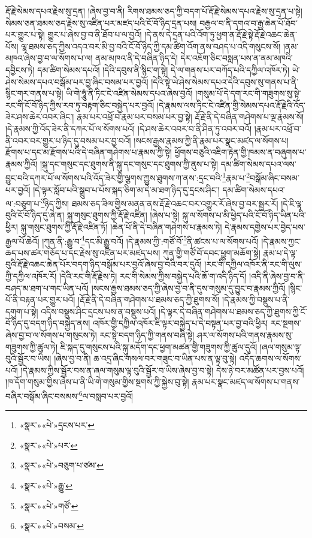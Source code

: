 རྡོ་རྗེ་སེམས་དཔའ་རྗེས་སུ་དྲན། །ཞེས་བྱ་བ་ནི། རིགས་ཐམས་ཅད་ཀྱི་བདག་པོ་རྡོ་རྗེ་སེམས་དཔའ་རྗེས་སུ་དྲན་པ་སྟེ། སེམས་ཅན་ཐམས་ཅད་རྗེས་སུ་འཛིན་པར་མཛད་པའི་ངོ་བོ་ཉིད་དྲན་པས། བརྒྱལ་བ་ནི་དགའ་བ་རྒྱ་ཆེན་པོ་ཐོབ་པར་གྱུར་པ་སྟེ། གྱུར་པ་ཞེས་བྱ་བ་ནི་ཐོབ་པ་ལ་བྱའོ། །དེ་ནས་དེ་དྲན་པའི་འོག་ཏུ་ཕྱག་ན་རྡོ་རྗེ་སྟེ་རྡོ་རྗེ་འཆང་ཆེན་པོས། ལྷ་ཐམས་ཅད་ཀྱིས་འདའ་བར་མི་བྱ་བའི་ངོ་བོ་ཉིད་ཀྱི་དམ་ཚིག་འོག་ནས་བཤད་པ་འདི་གསུངས་སོ། །ནམ་མཁའ་ཞེས་བྱ་བ་ལ་སོགས་པ་ལ། ནམ་མཁའ་ནི་དེ་བཞིན་ཉིད་དེ། དེར་འཇོག་ཅིང་བསླན་པས་ན་ནམ་མཁའི་དབྱིངས་ཏེ། དམ་ཚིག་སེམས་དཔའོ། །དེའི་དབུས་ནི་སྙིང་ག་སྟེ། དེ་ལ་གནས་པར་བཀོད་པའི་དཀྱིལ་འཁོར་ཏེ། ཡེ་ཤེས་སེམས་དཔའ་བསྒོམ་པར་བྱ་ཞིང་བསམ་པར་བྱའོ། །དེའི་སྟེ་ཡེ་ཤེས་སེམས་དཔའ་དེའི་དབུས་སུ་གནས་པ་ནི་སྙིང་གར་གནས་པ་སྟེ། ཡི་གེ་ཧཱུཾ་ནི་ཏིང་ངེ་འཛིན་སེམས་དཔའ་ཞེས་བྱའོ། །གསུམ་པོ་དེ་དག་རང་གི་གཟུགས་སུ་སྟེ་རང་གི་ངོ་བོ་ཉིད་ཀྱིས་རབ་ཏུ་བརྟག་ཅིང་བསྐྱེད་པར་བྱའོ། །དེ་རྣམས་ལས་ཏིང་ངེ་འཛིན་གྱི་སེམས་དཔའ་རྡོ་རྗེའི་འོད་ཟེར་ཤས་ཆེར་འབར་ཞིང་། རྣམ་པར་འཕྲོ་བ་རྣམ་པར་བསམ་པར་བྱ་སྟེ། རྡོ་རྗེ་ནི་དེ་བཞིན་གཤེགས་པ་ལྔ་རྣམས་སོ། །དེ་རྣམས་ཀྱི་འོད་ཟེར་ནི་དཀར་པོ་ལ་སོགས་པའོ། །དེ་ཤས་ཆེར་འབར་བ་ནི་ཤིན་ཏུ་འབར་བའོ། །རྣམ་པར་འཕྲོ་བ་ནི་འབར་བར་གྱུར་པ་ཉིད་དུ་བསམ་པར་བྱ་བའོ། །སངས་རྒྱས་རྣམས་ཀྱི་ནི་རྣམ་པར་སྣང་མཛད་ལ་སོགས་པ། རྫོགས་པ་དང་མ་རྫོགས་པའི་དེ་བཞིན་གཤེགས་པ་རྣམས་ཀྱི་སྟེ། ཕྱོགས་བཅུའི་འཇིག་རྟེན་གྱི་ཁམས་ན་བཞུགས་པ་རྣམས་ཀྱིའོ། །སྐུ་དང་གསུང་དང་ཐུགས་ནི་སྐུ་དང་གསུང་དང་ཐུགས་ཀྱི་ནུས་པ་སྟེ། དམ་ཚིག་སེམས་དཔའ་ལས་བྱུང་བའི་དཀར་པོ་ལ་སོགས་པའི་འོད་ཟེར་གྱི་ལྕགས་ཀྱུས་ཐུགས་ཀ་ནས་:དྲང་བའི་\footnote{«སྣར་»«པེ་»དྲངས་པར་}རྣམ་པ་\footnote{«སྣར་»«པེ་»པར་}བསྒོམ་ཞིང་བསམ་པར་བྱའོ། །དེ་ལྟར་སློབ་པའི་སྒྲུབ་པ་པོས་སྐད་ཅིག་མ་དེ་མ་ཐག་ཉིད་དུ་དྲངས་ཤིང་། དམ་ཚིག་སེམས་དཔའ་ལ་:བཅུག་པ་\footnote{«སྣར་»«པེ་»བཅུག་པ་ཙམ་}ཉིད་ཀྱིས། ཐམས་ཅད་ཟིལ་གྱིས་མནན་ནས་རྡོ་རྗེ་འཆང་བར་འགྱུར་རོ་ཞེས་བྱ་བར་སྦྱར་རོ། །དེ་ཇི་ལྟ་བུའི་ངོ་བོ་ཉིད་དུ་ཞེ་ན། སྐུ་གསུང་ཐུགས་ཀྱི་རྡོ་རྗེ་འཛིན། །ཞེས་པ་སྟེ། སྐུ་ལ་སོགས་པ་མི་ཕྱེད་པའི་ངོ་བོ་ཉིད་ཡིན་པའི་ཕྱིར། སྐུ་གསུང་ཐུགས་ཀྱི་རྡོ་རྗེ་འཛིན་ཏོ། །ཆེན་པོ་ནི་དེ་བཞིན་གཤེགས་པ་རྣམས་ཏེ། དེ་རྣམས་དགྱེས་པར་བྱེད་པས་རྒྱལ་པོ་ཆེའོ། །ཀུན་ནི་:རྒྱུ་བ་\footnote{«སྣར་»«པེ་»རྒྱུ་}དང་མི་རྒྱུ་བའོ། །དེ་རྣམས་ཀྱི་:གཙོ་བོ་\footnote{«སྣར་»«པེ་»གཙོ་}ནི་ཚངས་པ་ལ་སོགས་པའོ། །དེ་རྣམས་ཀྱང་ཆད་པས་ཚར་གཅོད་པ་དང་རྗེས་སུ་འཛིན་པར་མཛད་པས། ཀུན་གྱི་གཙོ་བོ་དབང་ཕྱུག་མཆོག་སྟེ། རྣམ་པ་དེ་ལྟ་བུའི་རྡོ་རྗེ་འཆང་ཆེན་པོར་བདག་ཉིད་བསྒོམ་པར་བྱའོ་ཞེས་བྱ་བའི་བར་དུའོ། །རང་གི་དཀྱིལ་འཁོར་ནི་རང་གི་ལུས་ཀྱི་དཀྱིལ་འཁོར་རོ། །དེའི་རང་གི་རྡོ་རྗེས་ཏེ། རང་གི་སེམས་ཀྱིས་བསྐྱེད་པའི་ཆོ་ག་འདི་ཉིད་དོ། །འདི་ནི་ཞེས་བྱ་བ་ནི་བཤད་མ་ཐག་པ་གང་ཡིན་པའོ། །སངས་རྒྱས་ཐམས་ཅད་ཀྱི་ཞེས་བྱ་བ་ནི་དུས་གསུམ་དུ་བྱུང་བ་རྣམས་ཀྱིའོ། །སྙིང་པོ་ནི་བརྟན་པར་གྱུར་པའོ། །རྡོ་རྗེ་ནི་དེ་བཞིན་གཤེགས་པ་ཐམས་ཅད་ཀྱི་ཐུགས་སོ། །དེ་རྣམས་ཀྱི་བསྡུས་པ་ནི་དགུག་པ་སྟེ། འདིས་བསྡུས་ཤིང་དྲངས་པས་ན་བསྡུས་པའོ། །དེ་ལྟར་དེ་བཞིན་གཤེགས་པ་ཐམས་ཅད་ཀྱི་ཐུགས་ཀྱི་ངོ་བོ་ཉིད་དུ་བདག་ཉིད་བསྐྱེད་ནས། འཁོར་གྱི་དཀྱིལ་འཁོར་ཇི་ལྟར་བསྐྱེད་པ་དེ་བསྟན་པར་བྱ་བའི་ཕྱིར། རང་སྔགས་ཞེས་བྱ་བ་ལ་སོགས་པ་གསུངས་ཏེ། རང་སྟེ་བདག་ཉིད་ཀྱི་གནས་བཞི་སྟེ། ཤར་ལ་སོགས་པའི་གནས་རྣམས་སུ་གཟུགས་ཀྱི་ཚུལ་ཏེ། ཇི་སྐད་དུ་གསུངས་པའི་སྐུ་མདོག་དང་ཕྱག་མཚན་གྱི་གཟུགས་ཀྱི་ཚུལ་དུའོ། །ཞལ་གསུམ་ལྟ་བུའི་སྦྱོར་བ་ཡིས། །ཞེས་བྱ་བ་ནི། ཆ་འདྲ་ཞིང་གསལ་བར་གཟུང་བ་ཡིན་པས་ན་ལྟ་བུ་སྟེ། འདོད་ཆགས་ལ་སོགས་པའོ། །དེ་རྣམས་ཀྱིས་སྦྱོར་བས་ན་ཞལ་གསུམ་ལྟ་བུའི་སྦྱོར་བ་ཡིས་ཞེས་བྱ་བ་སྟེ། དེས་ཉེ་བར་མཚོན་པར་བྱས་པའོ། །ཁ་དོག་གསུམ་གྱིས་ཞེས་པ་ནི་ཡི་གེ་གསུམ་གྱིས་སྔགས་ཀྱི་སྐྱེས་བུ་སྟེ། རྣམ་པར་སྣང་མཛད་ལ་སོགས་པ་གནས་བཞིར་བསྒོམ་ཞིང་བསམས་\footnote{«སྣར་»«པེ་»བསམ་}ལ་བསླབ་པར་བྱའོ། 